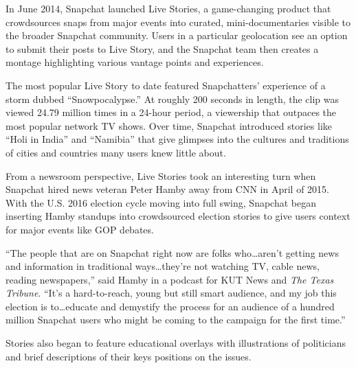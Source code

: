 \documentclass[notoc, symmetric, nobib, nols]{towcenter-guideto-book}
\begin{document}
In June 2014, Snapchat launched Live Stories, a game-changing product that crowdsources snaps from major events into curated, mini-documentaries visible to the broader Snapchat community. Users in a particular geolocation see an option to submit their posts to Live Story, and the Snapchat team then creates a montage highlighting various vantage points and experiences.

The most popular Live Story to date featured Snapchatters' experience of a storm dubbed ``Snowpocalypse.'' At roughly 200 seconds in length, the clip was viewed 24.79 million times in a 24-hour period, a viewership that outpaces the most popular network TV shows. Over time, Snapchat introduced stories like ``Holi in India'' and ``Namibia'' that give glimpses into the cultures and traditions of cities and countries many users knew little about.  

From a newsroom perspective, Live Stories took an interesting turn when Snapchat hired news veteran Peter Hamby away from CNN in April of 2015. With the U.S. 2016 election cycle moving into full swing, Snapchat began inserting Hamby standups into crowdsourced election stories to give users context for major events like GOP debates.  


``The people that are on Snapchat right now are folks who\ldots aren't getting news and information in traditional ways\ldots they're not watching TV, cable news, reading newspapers,'' said Hamby in a podcast for KUT News and \textit{The Texas Tribune}. ``It's a hard-to-reach, young but still smart audience, and my job this election is to\ldots educate and demystify the process for an audience of a hundred million Snapchat users who might be coming to the campaign for the first time.''\autocite{KUTSnapchatElection} 


Stories also began to feature educational overlays with illustrations of politicians and brief descriptions of their keys positions on the issues.  



\end{document}
